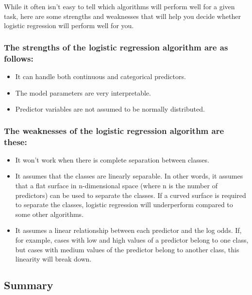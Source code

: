 \documentclass[
]{article}
\providecommand{\tightlist}{%
  \setlength{\itemsep}{0pt}\setlength{\parskip}{0pt}}
\begin{document}
While it often isn't easy to tell which algorithms will perform well for
a given task, here are some strengths and weaknesses that will help you
decide whether logistic regression will perform well for you.

\subsubsection{The strengths of the logistic regression algorithm are as
follows:}\label{the-strengths-of-the-logistic-regression-algorithm-are-as-follows}

\begin{itemize}
\tightlist
\item
  It can handle both continuous and categorical predictors.
\item
  The model parameters are very interpretable.
\item
  Predictor variables are not assumed to be normally distributed.
\end{itemize}

\subsubsection{The weaknesses of the logistic regression algorithm are
these:}\label{the-weaknesses-of-the-logistic-regression-algorithm-are-these}

\begin{itemize}
\tightlist
\item
  It won't work when there is complete separation between classes.
\item
  It assumes that the classes are linearly separable. In other words, it
  assumes that a flat surface in n-dimensional space (where n is the
  number of predictors) can be used to separate the classes. If a curved
  surface is required to separate the classes, logistic regression will
  underperform compared to some other algorithms.
\item
  It assumes a linear relationship between each predictor and the log
  odds. If, for example, cases with low and high values of a predictor
  belong to one class, but cases with medium values of the predictor
  belong to another class, this linearity will break down.
\end{itemize}

\subsection{Summary}\label{summary-2}
\end{document}
